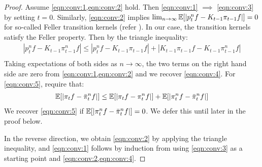 \begin{proof}
	Assume \cref{eqn:conv:1,eqn:conv:2} hold. Then \cref{eqn:conv:1} $\implies$ \cref{eqn:conv:3} by setting $t=0$. Similarly, \cref{eqn:conv:2} implies $\lim_{n\to\infty} \mathbb{E}[ |p_t^n f - K_{t-1}\pi_{t-1} f|  ] = 0$ for so-called Feller transition kernels (refer \cite{bain2009}). In our case, the transition kernels satisfy the Feller property. Then by the triangle inequality:
	\begin{align}
	|p_t^n f - K_{t-1}\pi^{n}_{t-1} f| \leq |p_t^n f - K_{t-1}\pi_{t-1} f| + | K_{t-1}\pi_{t-1} f - K_{t-1}\pi^{n}_{t-1} f|\\	
	\end{align} Taking expectations of both sides as $n \to \infty$, the two terms on the right hand side are zero from \cref{eqn:conv:1,eqn:conv:2} and we recover \cref{eqn:conv:4}. For \cref{eqn:conv:5}, require that:
	\begin{align}
	\mathbb{E}[|\pi_t f - \bar{\pi}^n_t f|] \leq \mathbb{E}[|\pi_t f - \pi^n_t f|] + \mathbb{E}[|\pi^n_t f - \bar{\pi}^n_t f|]
	\end{align} We recover \cref{eqn:conv:5} if $\mathbb{E}[|\pi^n_t f - \bar{\pi}^n_t f|] = 0$. We defer this until later in the proof below. 
	
	In the reverse direction, we obtain \cref{eqn:conv:2} by applying the triangle inequality, and \cref{eqn:conv:1} follows by induction from using \cref{eqn:conv:3} as a starting point  and \cref{eqn:conv:2,eqn:conv:4}. 
	

\end{proof}
